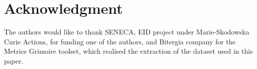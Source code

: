 \documentclass[10pt, conference]{IEEEtran}
\begin{document}
%






\section*{Acknowledgment}


The authors would like to thank SENECA, EID project under
Marie-Skodowska Curie Actions, for funding one of the authors, and 
Bitergia company for the Metrics Grimoire toolset, which realised the 
extraction of the dataset used in this paper.



\end{document}
